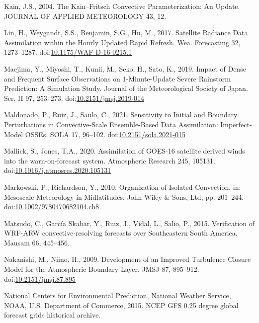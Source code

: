 \documentclass[final,5p,times,twocolumn,authoryear]{elsarticle} %
\begin{document}
\leavevmode\hypertarget{ref-kain2004}{}%
Kain, J.S., 2004. The Kain--Fritsch Convective Parameterization: An Update. JOURNAL OF APPLIED METEOROLOGY 43, 12.

\leavevmode\hypertarget{ref-lin2017a}{}%
Lin, H., Weygandt, S.S., Benjamin, S.G., Hu, M., 2017. Satellite Radiance Data Assimilation within the Hourly Updated Rapid Refresh. Wea. Forecasting 32, 1273--1287. doi:\href{https://doi.org/10.1175/WAF-D-16-0215.1}{10.1175/WAF-D-16-0215.1}

\leavevmode\hypertarget{ref-maejima2019}{}%
Maejima, Y., Miyoshi, T., Kunii, M., Seko, H., Sato, K., 2019. Impact of Dense and Frequent Surface Observations on 1-Minute-Update Severe Rainstorm Prediction: A Simulation Study. Journal of the Meteorological Society of Japan. Ser. II 97, 253--273. doi:\href{https://doi.org/10.2151/jmsj.2019-014}{10.2151/jmsj.2019-014}

\leavevmode\hypertarget{ref-maldonado2021}{}%
Maldonado, P., Ruiz, J., Saulo, C., 2021. Sensitivity to Initial and Boundary Perturbations in Convective-Scale Ensemble-Based Data Assimilation: Imperfect-Model OSSEs. SOLA 17, 96--102. doi:\href{https://doi.org/10.2151/sola.2021-015}{10.2151/sola.2021-015}

\leavevmode\hypertarget{ref-mallick2020}{}%
Mallick, S., Jones, T.A., 2020. Assimilation of GOES-16 satellite derived winds into the warn-on-forecast system. Atmospheric Research 245, 105131. doi:\href{https://doi.org/10.1016/j.atmosres.2020.105131}{10.1016/j.atmosres.2020.105131}

\leavevmode\hypertarget{ref-markowski2010}{}%
Markowski, P., Richardson, Y., 2010. Organization of Isolated Convection, in: Mesoscale Meteorology in Midlatitudes. John Wiley \& Sons, Ltd, pp. 201--244. doi:\href{https://doi.org/10.1002/9780470682104.ch8}{10.1002/9780470682104.ch8}

\leavevmode\hypertarget{ref-matsudo2015}{}%
Matsudo, C., García Skabar, Y., Ruiz, J., Vidal, L., Salio, P., 2015. Verification of WRF-ARW convective-resolving forecasts over Southeastern South America. Mausam 66, 445--456.

\leavevmode\hypertarget{ref-nakanishi2009}{}%
Nakanishi, M., Niino, H., 2009. Development of an Improved Turbulence Closure Model for the Atmospheric Boundary Layer. JMSJ 87, 895--912. doi:\href{https://doi.org/10.2151/jmsj.87.895}{10.2151/jmsj.87.895}

\leavevmode\hypertarget{ref-cisl_rda_ds084.1}{}%
National Centers for Environmental Prediction, National Weather Service, NOAA, U.S. Department of Commerce, 2015. NCEP GFS 0.25 degree global forecast grids historical archive.
\end{document}
